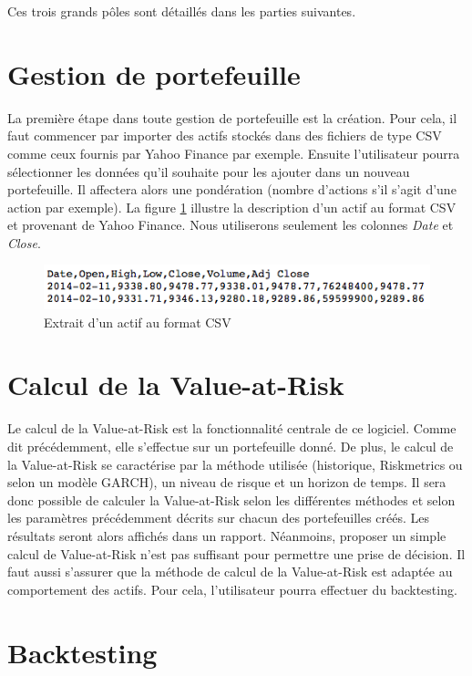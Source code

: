 \documentclass[a4paper,titlepage,french]{report}
\begin{document}
Ces trois grands pôles sont détaillés dans les parties suivantes.


\section{Gestion de portefeuille}

La première étape dans toute gestion de portefeuille est la création.
Pour cela, il faut commencer par importer des actifs stockés dans des fichiers de type CSV comme ceux fournis par Yahoo Finance par exemple.
Ensuite l'utilisateur pourra sélectionner les données qu'il souhaite pour les ajouter dans un nouveau portefeuille. Il affectera alors une pondération (nombre d'actions s'il s'agit d'une action par exemple).
La figure \ref{fig:csvexample} illustre la description d'un actif au format CSV et provenant de Yahoo Finance.
Nous utiliserons seulement les colonnes \textit{Date} et \textit{Close}.

\begin{figure}[h]
  \center
    \includegraphics[scale=0.5]{yahoo-dax-csv-example.png}
    \caption{Extrait d'un actif au format CSV}
  \label{fig:csvexample}
\end{figure}

\section{Calcul de la Value-at-Risk}

Le calcul de la Value-at-Risk est la fonctionnalité centrale de ce logiciel. Comme dit précédemment, elle s'effectue sur un portefeuille donné.
De plus, le calcul de la Value-at-Risk se caractérise par la méthode utilisée (historique, Riskmetrics ou selon un modèle GARCH), un niveau de risque et un horizon de temps.
Il sera donc possible de calculer la Value-at-Risk selon les différentes méthodes et selon les paramètres précédemment décrits sur chacun des portefeuilles créés.
Les résultats seront alors affichés dans un rapport. Néanmoins, proposer un simple calcul de Value-at-Risk n'est pas suffisant pour permettre une prise de décision.
Il faut aussi s'assurer que la méthode de calcul de la Value-at-Risk est adaptée au comportement des actifs.
Pour cela, l'utilisateur pourra effectuer du backtesting.


\section{Backtesting}
\end{document}
